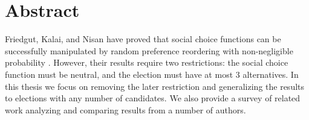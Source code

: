 
\chapter*{Abstract}

Friedgut, Kalai, and Nisan have proved that social choice functions can be successfully manipulated by random preference reordering with non-negligible probability \cite{friedgut2008elections}. However, their results require two restrictions: the social choice function must be neutral, and the election must have at most 3 alternatives. In this thesis we focus on removing the later restriction and generalizing the results to elections with any number of candidates. We also provide a survey of related work analyzing and comparing results from a number of authors.
